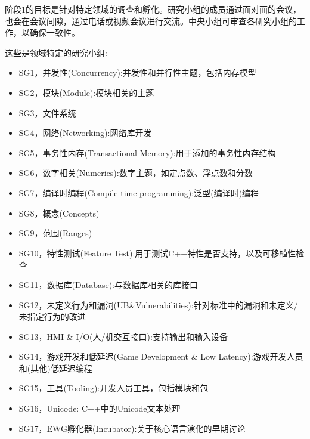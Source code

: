 

阶段1的目标是针对特定领域的调查和孵化。研究小组的成员通过面对面的会议，也会在会议间隙，通过电话或视频会议进行交流。中央小组可审查各研究小组的工作，以确保一致性。

这些是领域特定的研究小组:

\begin{itemize}
\item 
SG1，并发性(Concurrency):并发性和并行性主题，包括内存模型

\item 
SG2，模块(Module):模块相关的主题

\item 
SG3，文件系统

\item 
SG4，网络(Networking):网络库开发

\item 
SG5，事务性内存(Transactional Memory):用于添加的事务性内存结构

\item 
SG6，数字相关(Numerics):数字主题，如定点数、浮点数和分数

\item 
SG7，编译时编程(Compile time programming):泛型(编译时)编程

\item 
SG8，概念(Concepts)

\item 
SG9，范围(Ranges)

\item 
SG10，特性测试(Feature Test):用于测试C++特性是否支持，以及可移植性检查

\item 
SG11，数据库(Database):与数据库相关的库接口

\item 
SG12，未定义行为和漏洞(UB\&Vulnerabilities):针对标准中的漏洞和未定义/未指定行为的改进

\item 
SG13，HMI \& I/O(人/机交互接口):支持输出和输入设备

\item 
SG14，游戏开发和低延迟(Game Development \& Low Latency):游戏开发人员和(其他)低延迟编程

\item 
SG15，工具(Tooling):开发人员工具，包括模块和包

\item 
SG16，Unicode: C++中的Unicode文本处理

\item 
SG17，EWG孵化器(Incubator):关于核心语言演化的早期讨论


\end{itemize}
